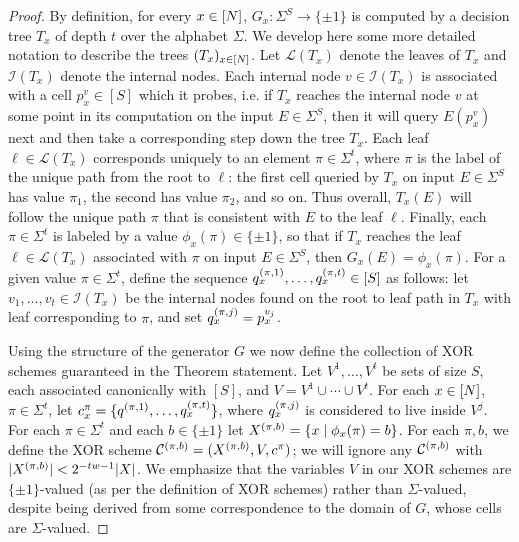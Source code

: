 \begin{proof}

By definition, for every $x \in [N]$, $G_x: \Sigma^S \to \{\pm 1\}$ is computed by a decision tree $T_x$ of depth $t$ over the alphabet $\Sigma$. We develop here some more detailed notation to describe the trees $(T_x)_{x \in [N]}$. Let $\mathcal{L}(T_x)$ denote the leaves of $T_x$ and $\mathcal{I}(T_x)$ denote the internal nodes. Each internal node $v \in \mathcal{I}(T_x)$ is associated with a cell $p_x^v \in [S]$ which it probes, i.e. if $T_x$ reaches the internal node $v$ at some point in its computation on the input $E\in \Sigma^S$, then it will query $E(p_x^v)$ next and then take a corresponding step down the tree $T_x$. Each leaf $\ell \in \mathcal{L}(T_x)$ corresponds uniquely to an element $\pi \in \Sigma^t$, where $\pi$ is the label of the unique path from the root to $\ell$: the first cell queried by $T_x$ on input $E \in \Sigma^S$ has value $\pi_1$, the second has value $\pi_2$, and so on. Thus overall, $T_x(E)$ will follow the unique path $\pi$ that is consistent with $E$ to the leaf $\ell$. 
Finally, each $\pi \in \Sigma^t$ is labeled by a value $\phi_x(\pi) \in \{\pm 1\}$, so that if $T_x$ reaches the leaf $\ell \in \mathcal{L}(T_x)$ associated with $\pi$ on input $E\in \Sigma^S$, then $G_x(E) = \phi_x(\pi)$. For a given value $\pi\in \Sigma^t$, define the sequence $q_x^{(\pi,1)},\ldots,q_x^{(\pi,t)} \in [S]$ as follows: let $v_1,\ldots,v_t \in \mathcal{I}(T_x)$ be the internal nodes found on the root to leaf path in $T_x$ with leaf corresponding to $\pi$, and set $q_x^{(\pi,j)} = p_x^{v_j}$.

Using the structure of the generator $G$ we now define the collection of XOR schemes guaranteed in the Theorem statement. Let $V^1,\ldots, V^t$ be sets of size $S$, each associated canonically with $[S]$, and $V = V^1 \cup \cdots \cup V^t$. For each $x\in [N]$, $\pi \in \Sigma^t$, let $c^{\pi}_x = \{q^{(\pi,1)},\ldots,q_x^{(\pi,t)}\}$, where $q_x^{(\pi,j)}$ is considered to live inside $V^j$. For each $\pi \in \Sigma^t$ and each $b \in \{\pm 1\}$ let $X^{(\pi,b)}= \{x \mid \phi_x(\pi)=b\}$. For each $\pi,b$, we define the XOR scheme $\mathcal{C}^{(\pi,b)} = (X^{(\pi,b)},V,c^\pi)$; we will ignore any $\mathcal{C}^{(\pi,b)}$ with $|X^{(\pi,b)}| < 2^{-tw-1}|X|$. We emphasize that the variables $V$ in our XOR schemes are $\{\pm 1\}$-valued (as per the definition of XOR schemes) rather than $\Sigma$-valued, despite being derived from some correspondence to the domain of $G$, whose cells are $\Sigma$-valued.


\end{proof}
